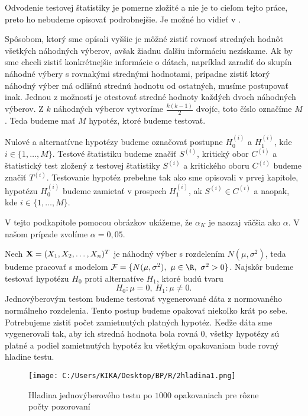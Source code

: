 Odvodenie testovej štatistiky je pomerne zložité a nie je to cieľom tejto práce, 
preto ho nebudeme opisovať podrobnejšie. Je možné ho vidieť v \cite{Andel07}. 

Spôsobom, ktorý sme opísali vyššie je môžné zistiť rovnosť stredných hodnôt všetkých náhodných výberov, 
avšak žiadnu ďalšiu informáciu nezískame. 
Ak by sme chceli zistiť konkrétnejšie informácie o dátach, napríklad zaradiť do skupín náhodné výbery s rovnakými strednými hodnotami, 
prípadne zistiť ktorý náhodný výber má odlišnú strednú hodnotu od ostatných, musíme postupovať inak. 
Jednou z možností je otestovať stredné hodnoty každých dvoch náhodných výberov. 
Z $k$ náhodných výberov vytvoríme $\frac{k(k-1)}{2}$ dvojíc, toto číslo označíme $M$. Teda budeme mať $M$ hypotéz, ktoré budeme testovať. 

Nulové a alternatívne hypotézy budeme označovať postupne $H^{(i)}_0$ a $H^{(i)}_1$, kde $i \in \{1, \dots, M\}$. 
Testové štatistiku budeme značiť $S^{(i)}$, kritický obor $C^{(i)}$ a štatistický test zložený z testovej štatistiky  $S^{(i)}$ 
a kritického oboru $C^{(i)}$ budeme značiť $T^{(i)}$. 
Testovanie hypotéz prebehne tak ako sme opisovali v prvej kapitole, 
hypotézu $H^{(i)}_0$ budeme zamietať v prospech $H^{(i)}_1$, ak $S^{(i)} \in C^{(i)}$ a naopak, kde $i \in \{1, \dots, M\}$. 






V tejto podkapitole pomocou obrázkov ukážeme, že $\alpha_K$ je naozaj väčšia ako $\alpha$. 
V našom prípade zvolíme $\alpha = 0,05$. 

Nech ${\bf X} = (X_1, X_2, \dots, X_n)^T$ je náhodný výber s rozdelením $N(\mu, \sigma^2)$, 
teda budeme pracovať s modelom $\mathcal{F} = \{ N(\mu, \sigma^2),~\mu \in \R,~\sigma^2>0 \}$. 
Najskôr budeme testovať hypotézu $H_0$ proti alternatíve $H_1$, ktoré budú tvaru 
$$ H_0: \mu = 0,~H_1: \mu \neq 0. $$
Jednovýberovým testom budeme testovať vygenerované dáta z normovaného normálneho rozdelenia. 
Tento postup budeme opakovať niekoľko krát po sebe. 
Potrebujeme zistiť počet zamietnutých platných hypotéz. 
Keďže dáta sme vygenerovali tak, aby ich stredná hodnota bola rovná $0$, 
všetky hypotézy sú platné a podiel zamietnutých hypotéz ku všetkým opakovaniam bude rovný hladine testu. 

\begin{figure}[h!]
  \centering
  \texttt{[image: C:/Users/KIKA/Desktop/BP/R/2hladina1.png]}
  \caption{Hladina jednovýberového testu po $1000$ opakovaniach pre rôzne počty pozorovaní}
  \label{obr02:01}
\end{figure}

